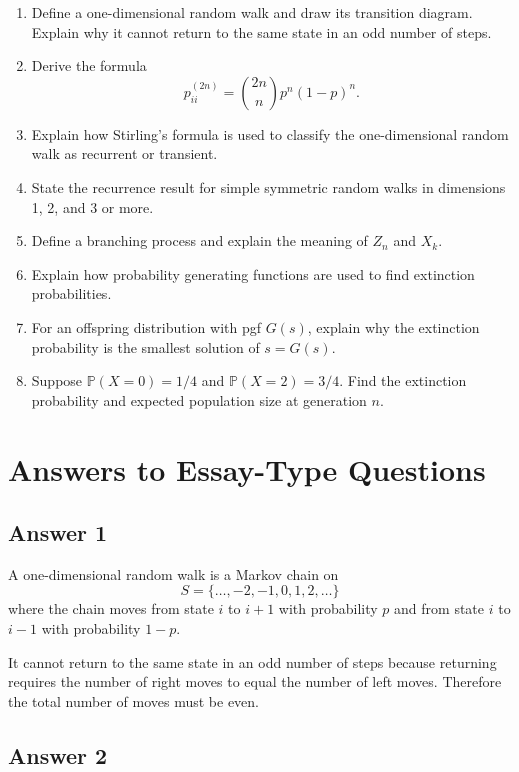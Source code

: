 \documentclass[12pt,a4paper]{article}
\theoremstyle{lecturestyle}
\newcommand{\Prob}{\mathbb{P}}
\begin{document}
\begin{enumerate}[label=\textbf{Q\arabic*.}, leftmargin=1.2cm]
    \item Define a one-dimensional random walk and draw its transition diagram. Explain why it cannot return to the same state in an odd number of steps.
    \item Derive the formula
    \[
    p_{ii}^{(2n)}=\binom{2n}{n}p^n(1-p)^n.
    \]
    \item Explain how Stirling's formula is used to classify the one-dimensional random walk as recurrent or transient.
    \item State the recurrence result for simple symmetric random walks in dimensions 1, 2, and 3 or more.
    \item Define a branching process and explain the meaning of $Z_n$ and $X_k$.
    \item Explain how probability generating functions are used to find extinction probabilities.
    \item For an offspring distribution with pgf $G(s)$, explain why the extinction probability is the smallest solution of $s=G(s)$.
    \item Suppose $\Prob(X=0)=1/4$ and $\Prob(X=2)=3/4$. Find the extinction probability and expected population size at generation $n$.
\end{enumerate}

\section{Answers to Essay-Type Questions}

\subsection*{Answer 1}

A one-dimensional random walk is a Markov chain on
\[
S=\{\ldots,-2,-1,0,1,2,\ldots\}
\]
where the chain moves from state $i$ to $i+1$ with probability $p$ and from state $i$ to $i-1$ with probability $1-p$.

It cannot return to the same state in an odd number of steps because returning requires the number of right moves to equal the number of left moves. Therefore the total number of moves must be even.

\subsection*{Answer 2}
\end{document}
